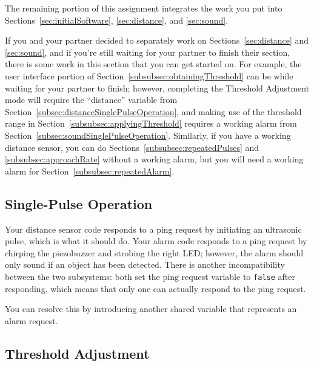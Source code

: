 The remaining portion of this assignment integrates the work you put into Sections~\ref{sec:initialSoftware}, \ref{sec:distance}, and \ref{sec:sound}.

If you and your partner decided to separately work on Sections~\ref{sec:distance} and \ref{sec:sound}, and if you're still waiting for your partner to finish their section, there is some work in this section that you can get started on.
For example, the user interface portion of Section~\ref{subsubsec:obtainingThreshold} can be while waiting for your partner to finish; however, completing the Threshold Adjustment mode will require the ``distance'' variable from Section~\ref{subsec:distanceSinglePulseOperation}, and making use of the threshold range in Section~\ref{subsubsec:applyingThreshold} requires a working alarm from Section~\ref{subsec:soundSinglePulseOperation}.
Similarly, if you have a working distance sensor, you can do Sections~\ref{subsubsec:repeatedPulses} and \ref{subsubsec:approachRate} without a working alarm, but you will need a working alarm for Section~\ref{subsubsec:repeatedAlarm}.

\subsection{Single-Pulse Operation} \label{subsec:integrationSpeedSinglePulseOperation}

Your distance sensor code responds to a ping request by initiating an ultrasonic pulse, which is what it should do.
Your alarm code responds to a ping request by chirping the piezobuzzer and strobing the right LED;
however, the alarm should only sound if an object has been detected.
There is another incompatibility between the two subsystems:
both set the ping request variable to \lstinline{false} after responding, which means that only one can actually respond to the ping request.

You can resolve this by introducing another shared variable that represents an alarm request.
\begin{description}
\end{description}


\subsection{Threshold Adjustment}

